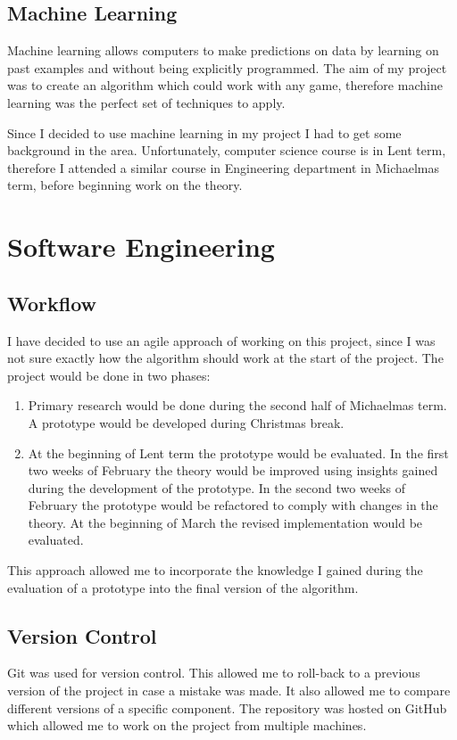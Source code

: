 \documentclass[12pt,a4paper]{book}
\begin{document}
\subsection{Machine Learning}
Machine learning allows computers to make predictions on data by learning on past examples and without being explicitly programmed.
The aim of my project was to create an algorithm which could work with any game, therefore machine learning was the perfect set of techniques to apply.

Since I decided to use machine learning in my project I had to get some background in the area.
Unfortunately, computer science course is in Lent term, therefore I attended a similar course in Engineering department in Michaelmas term, before beginning work on the theory.
\section{Software Engineering}
\subsection{Workflow}
I have decided to use an agile approach of working on this project, since I was not sure exactly how the algorithm should work at the start of the project.
The project would be done in two phases:
\begin{enumerate}
\item Primary research would be done during the second half of Michaelmas term.
A prototype would be developed during Christmas break.
\item At the beginning of Lent term the prototype would be evaluated.
In the first two weeks of February the theory would be improved using insights gained during the development of the prototype.
In the second two weeks of February the prototype would be refactored to comply with changes in the theory.
At the beginning of March the revised implementation would be evaluated.
\end{enumerate}
This approach allowed me to incorporate the knowledge I gained during the evaluation of a prototype into the final version of the algorithm.
\subsection{Version Control}
Git was used for version control.
This allowed me to roll-back to a previous version of the project in case a mistake was made.
It also allowed me to compare different versions of a specific component.
The repository was hosted on GitHub which allowed me to work on the project from multiple machines.
\end{document}
